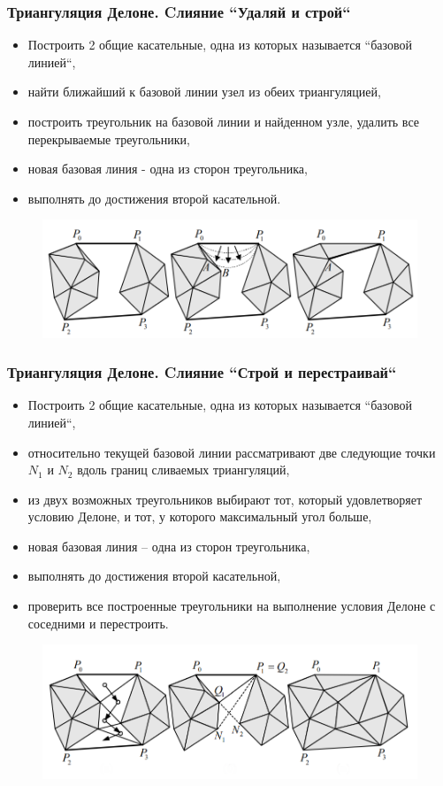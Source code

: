 \documentclass[notheorems,aspectratio=169]{beamer}
\begin{document}
\begin{frame}\frametitle{Триангуляция Делоне. Cлияние ``Удаляй и строй``}
	\begin{itemize}
		\item Построить 2 общие касательные, одна из которых называется ``базовой линией``,
		\item найти ближайший к базовой линии узел из обеих триангуляцией,
		\item построить треугольник на базовой линии и найденном узле, удалить все перекрываемые треугольники,
		\item новая базовая линия - одна из сторон треугольника,
		\item выполнять до достижения второй касательной.
	\end{itemize}
	\begin{figure}
		\includegraphics[height=0.4\textheight, keepaspectratio]{a.png}
	\end{figure}
\end{frame}

\begin{frame}\frametitle{Триангуляция Делоне. Cлияние ``Строй и перестраивай``}
	\begin{itemize}
		\item Построить 2 общие касательные, одна из которых называется ``базовой линией``,
		\item относительно текущей базовой линии рассматривают две следующие точки $N_1$ и $N_2$ вдоль границ
		сливаемых триангуляций,
		\item из двух возможных треугольников выбирают тот, который удовлетворяет условию Делоне, и тот, 
		у которого максимальный угол больше,
		\item новая базовая линия -- одна из сторон треугольника,
		\item выполнять до достижения второй касательной,
		\item проверить все построенные треугольники на выполнение условия Делоне с соседними и перестроить.
	\end{itemize}
	\begin{figure}
		\includegraphics[height=0.3\textheight, keepaspectratio]{b.png}
	\end{figure}
\end{frame}
\end{document}
